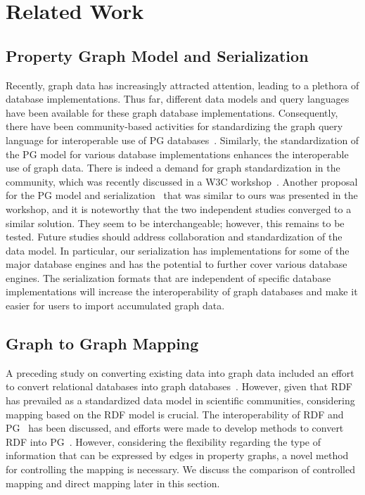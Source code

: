 \documentclass[runningheads]{llncs}
\begin{document}
\section{Related Work}

\subsection{Property Graph Model and Serialization}
Recently, graph data has increasingly attracted attention, leading to a plethora of database implementations. 
Thus far, different data models and query languages have been available for these graph database implementations.
Consequently, there have been community-based activities for standardizing the graph query language for interoperable use of PG databases~\cite{angles3}. Similarly, the standardization of the PG model for various database implementations enhances the interoperable use of graph data. There is indeed a demand for graph standardization in the community, which was recently discussed in a W3C workshop~\cite{w3c}. Another proposal for the PG model and serialization~\cite{tomaszuk} that was similar to ours was presented in the workshop, and it is noteworthy that the two independent studies converged to a similar solution. They seem to be interchangeable; however, this remains to be tested. Future studies should address collaboration and standardization of the data model.
In particular, our serialization has implementations for some of the major database engines and has the potential to further cover various database engines. 
The serialization formats that are independent of specific database implementations will increase the interoperability of graph databases and make it easier for users to import accumulated graph data.

\subsection{Graph to Graph Mapping}
A preceding study on converting existing data into graph data included an effort to convert relational databases into graph databases~\cite{virgilio1}. 
However, given that RDF has prevailed as a standardized data model in scientific communities, considering mapping based on the RDF model is crucial. The interoperability of RDF and PG~\cite{hartig,angles4,das,thakkar} has been discussed, and efforts were made to develop methods to convert RDF into PG~\cite{tomaszuk1,virgilio}. However, considering the flexibility regarding the type of information that can be expressed by edges in property graphs, a novel method for controlling the mapping is necessary.
We discuss the comparison of controlled mapping and direct mapping later in this section.
\end{document}
